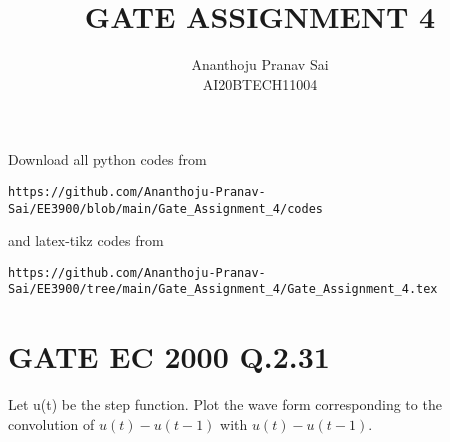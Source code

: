 \documentclass[journal,12pt,twocolumn]{IEEEtran}
\begin{document}
     \def\centbox#1{\makebox[0in]{#1}}
     \def\topbox#1{\raisebox{-\baselineskip}[0in][0in]{#1}}
     \def\midbox#1{\raisebox{-0.5\baselineskip}[0in][0in]{#1}}
\vspace{3cm}
\title{GATE ASSIGNMENT 4}
\author{Ananthoju Pranav Sai \\ AI20BTECH11004}
\maketitle
\newpage
\bigskip
\renewcommand{\thefigure}{\theenumi}
\renewcommand{\thetable}{\theenumi}
Download all python codes from 
\begin{lstlisting}
https://github.com/Ananthoju-Pranav-Sai/EE3900/blob/main/Gate_Assignment_4/codes
\end{lstlisting}
%
and latex-tikz codes from 
%
\begin{lstlisting}
https://github.com/Ananthoju-Pranav-Sai/EE3900/tree/main/Gate_Assignment_4/Gate_Assignment_4.tex
\end{lstlisting}
%
\section{GATE EC 2000 Q.2.31}
Let u(t) be the step function. Plot the wave form corresponding to the convolution of $u(t)-u(t-1)$ with $u(t)-u(t-1)$.
\end{document}

